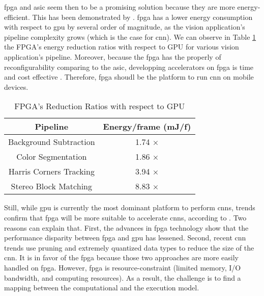 \acrshort{fpga} and \acrshort{asic} seem then to be a promising solution because they are more energy-efficient. This has been demonstrated by \textcite{qasaimeh_comparing_2019}. \acrshort{fpga} has a lower energy consumption with respect to \acrshort{gpu} by several order of magnitude, as the vision application’s pipeline complexity grows (which is the case for \acrshort{cnn}). We can observe in Table \ref{tab:benchener} the FPGA’s energy reduction ratios with respect to GPU for various vision application’s pipeline. Moreover, because the \acrshort{fpga} has the properly of reconfigurability comparing to the \acrshort{asic}, developping accelerators on \acrshort{fpga} is time and cost effective \cite{motamedi_placid_2017}. Therefore, \acrshort{fpga} shoudl be the platform to run \acrshort{cnn} on mobile devices.
%
\begin{table}[H]
    \center
    \begin{tabular}{|c|c|}
        \hline
        Pipeline & Energy/frame (mJ/f) \\
        \hline
        Background Subtraction & 1.74 $\times$\\
        \hline
        Color Segmentation & 1.86 $\times$ \\
        \hline
        Harris Corners Tracking & 3.94 $\times$ \\
        \hline
        Stereo Block Matching & 8.83 $\times$ \\
        \hline
    \end{tabular}
    \caption{FPGA’s Reduction Ratios with respect to GPU \cite{qasaimeh_comparing_2019}}
    \label{tab:benchener}
\end{table}

Still, while \acrshort{gpu} is currently the most dominant platform to perform \acrshort{cnn}s, trends confirm that \acrshort{fpga} will be more suitable to accelerate \acrshort{cnn}s, according to \textcite{nurvitadhi_can_2017}. Two reasons can explain that. First, the advances in \acrshort{fpga} technology show that the performance disparity between \acrshort{fpga} and \acrshort{gpu} has lessened. Second, recent \acrshort{cnn} trends use pruning and extremely quantized data types to reduce the size of the \acrshort{cnn}. It is in favor of the \acrshort{fpga} because those two approaches are more easily handled on \acrshort{fpga}. However, \acrshort{fpga} is resource-constraint (limited memory, I/O bandwidth, and computing resources). As a result, the challenge is to find a mapping between the computational and the execution model.

